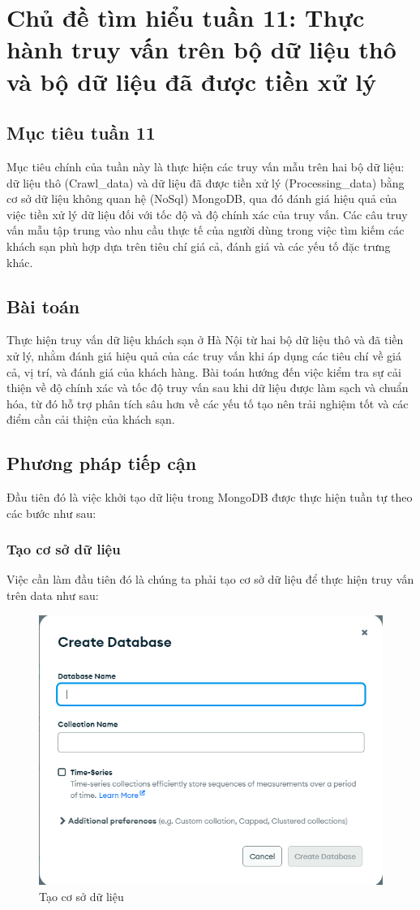 \section{Chủ đề tìm hiểu tuần 11: Thực hành truy vấn trên bộ dữ liệu thô và bộ dữ liệu đã được tiền xử lý}

\setcounter{figure}{0} %
\renewcommand{\thefigure}{5.\arabic{figure}}

\subsection{Mục tiêu tuần 11} 
Mục tiêu chính của tuần này là thực hiện các truy vấn mẫu trên hai bộ dữ liệu: dữ liệu thô (Crawl\_data) và dữ liệu đã được tiền xử lý (Processing\_data) bằng cơ sở dữ liệu không quan hệ (NoSql) MongoDB, qua đó đánh giá hiệu quả của việc tiền xử lý dữ liệu đối với tốc độ và độ chính xác của truy vấn. Các câu truy vấn mẫu tập trung vào nhu cầu thực tế của người dùng trong việc tìm kiếm các khách sạn phù hợp dựa trên tiêu chí giá cả, đánh giá và các yếu tố đặc trưng khác.

\subsection{Bài toán} 
Thực hiện truy vấn dữ liệu khách sạn ở Hà Nội từ hai bộ dữ liệu thô và đã tiền xử lý, nhằm đánh giá hiệu quả của các truy vấn khi áp dụng các tiêu chí về giá cả, vị trí, và đánh giá của khách hàng. Bài toán hướng đến việc kiểm tra sự cải thiện về độ chính xác và tốc độ truy vấn sau khi dữ liệu được làm sạch và chuẩn hóa, từ đó hỗ trợ phân tích sâu hơn về các yếu tố tạo nên trải nghiệm tốt và các điểm cần cải thiện của khách sạn.

\subsection{Phương pháp tiếp cận}
Đầu tiên đó là việc khởi tạo dữ liệu trong MongoDB được thực hiện tuần tự theo các bước như sau:

\subsubsection{Tạo cơ sở dữ liệu}
Việc cần làm đầu tiên đó là chúng ta phải tạo cơ sở dữ liệu để thực hiện truy vấn trên data như sau:

\begin{figure}[H]
    \centering
    \includegraphics[width=0.5\linewidth]{Figures/11.1.png}
    \caption{Tạo cơ sở dữ liệu}
\end{figure}

